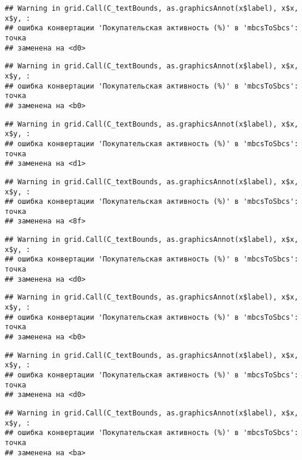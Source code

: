 \documentclass[
]{article}
\begin{document}
\begin{verbatim}
## Warning in grid.Call(C_textBounds, as.graphicsAnnot(x$label), x$x, x$y, :
## ошибка конвертации 'Покупательская активность (%)' в 'mbcsToSbcs': точка
## заменена на <d0>
\end{verbatim}

\begin{verbatim}
## Warning in grid.Call(C_textBounds, as.graphicsAnnot(x$label), x$x, x$y, :
## ошибка конвертации 'Покупательская активность (%)' в 'mbcsToSbcs': точка
## заменена на <b0>
\end{verbatim}

\begin{verbatim}
## Warning in grid.Call(C_textBounds, as.graphicsAnnot(x$label), x$x, x$y, :
## ошибка конвертации 'Покупательская активность (%)' в 'mbcsToSbcs': точка
## заменена на <d1>
\end{verbatim}

\begin{verbatim}
## Warning in grid.Call(C_textBounds, as.graphicsAnnot(x$label), x$x, x$y, :
## ошибка конвертации 'Покупательская активность (%)' в 'mbcsToSbcs': точка
## заменена на <8f>
\end{verbatim}

\begin{verbatim}
## Warning in grid.Call(C_textBounds, as.graphicsAnnot(x$label), x$x, x$y, :
## ошибка конвертации 'Покупательская активность (%)' в 'mbcsToSbcs': точка
## заменена на <d0>
\end{verbatim}

\begin{verbatim}
## Warning in grid.Call(C_textBounds, as.graphicsAnnot(x$label), x$x, x$y, :
## ошибка конвертации 'Покупательская активность (%)' в 'mbcsToSbcs': точка
## заменена на <b0>
\end{verbatim}

\begin{verbatim}
## Warning in grid.Call(C_textBounds, as.graphicsAnnot(x$label), x$x, x$y, :
## ошибка конвертации 'Покупательская активность (%)' в 'mbcsToSbcs': точка
## заменена на <d0>
\end{verbatim}

\begin{verbatim}
## Warning in grid.Call(C_textBounds, as.graphicsAnnot(x$label), x$x, x$y, :
## ошибка конвертации 'Покупательская активность (%)' в 'mbcsToSbcs': точка
## заменена на <ba>
\end{verbatim}
\end{document}

